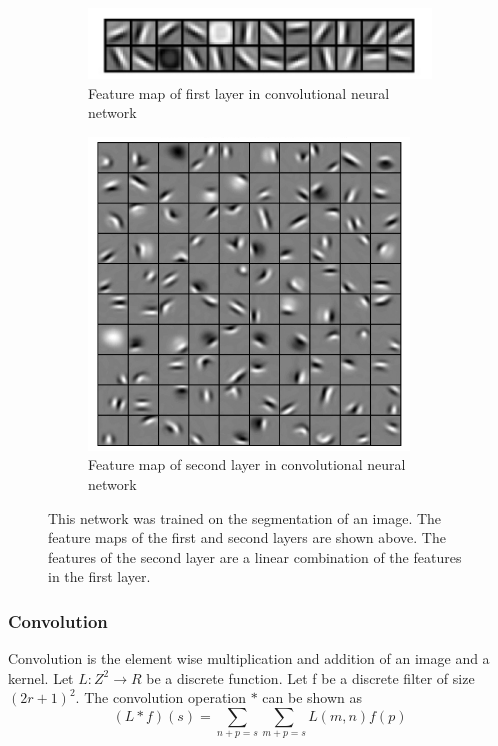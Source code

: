 \begin{figure}
\centering
\begin{subfigure}{.5\textwidth}
  \centering
  \includegraphics[width=.6\linewidth]{first_layer_features.png}
  \caption{Feature map of first layer in convolutional neural network}
  \label{fig:first_feature}
\end{subfigure}%
\begin{subfigure}{.5\textwidth}
  \centering
  \includegraphics[width=.6\linewidth]{Second_layer_features.png}
  \caption{Feature map of second layer in convolutional neural network}
  \label{fig:second_feature}
\end{subfigure}
\caption{This network was trained on the segmentation of an image. The feature maps of the first and second layers are shown above. The features of the second layer are a linear combination of the features in the first layer. }
\label{fig:feature_map}
\end{figure}
    
\subsubsection{Convolution}
    Convolution is the element wise multiplication and addition of an image and a kernel. 
    Let $L:Z^2 \rightarrow R $ be a discrete function. 
    Let f be a discrete filter of size $(2r+1)^2 $. 
    The convolution operation $*$ can be shown as
\begin{equation}
 (L * f)(s) = \sum_{n+p=s}\sum_{m+p=s} L(m,n)f(p)\label{eq:convolution}
\end{equation}
    
